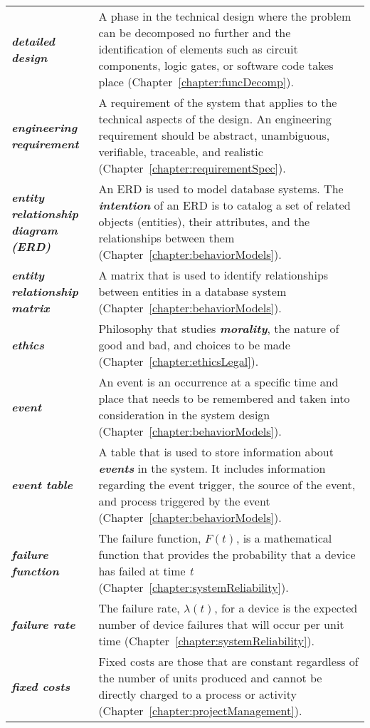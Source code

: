 \begin{longtable} { p{3cm} p{11cm}}
\emph{\textbf{detailed design}} & A phase in the technical design where
the problem can be decomposed no further and the identification of
elements such as circuit components, logic gates, or software code takes
place (Chapter~\ref{chapter:funcDecomp}). \B \\
\emph{\textbf{engineering requirement}} & A requirement of the system
that applies to the technical aspects of the design. An engineering
requirement should be abstract, unambiguous, verifiable, traceable, and
realistic (Chapter~\ref{chapter:requirementSpec}). \B \\
\emph{\textbf{entity relationship diagram (ERD)}} & An ERD is used to
model database systems. The \emph{\textbf{intention}} of an ERD is to
catalog a set of related objects (entities), their attributes, and the
relationships between them (Chapter~\ref{chapter:behaviorModels}). \B \\
\emph{\textbf{entity relationship matrix}} & A matrix that is used to
identify relationships between entities in a database system 
(Chapter~\ref{chapter:behaviorModels}). \B \\
\emph{\textbf{ethics}} & Philosophy that studies
\emph{\textbf{morality}}, the nature of good and bad, and choices to be
made (Chapter~\ref{chapter:ethicsLegal}). \B \\
\emph{\textbf{event}} & An event is an occurrence at a specific time and
place that needs to be remembered and taken into consideration in the
system design (Chapter~\ref{chapter:behaviorModels}). \B \\
\emph{\textbf{event table}} & A table that is used to store information
about \emph{\textbf{events}} in the system. It includes information
regarding the event trigger, the source of the event, and process
triggered by the event (Chapter~\ref{chapter:behaviorModels}). \B \\
\emph{\textbf{failure function}} & The failure function, $F(t)$, is
a mathematical function that provides the probability that a device has
failed at time \emph{t} (Chapter~\ref{chapter:systemReliability}). \B \\
\emph{\textbf{failure rate}} & The failure rate, $\lambda(t)$, for a
device is the expected number of device failures that will occur per
unit time (Chapter~\ref{chapter:systemReliability}). \B \\
\emph{\textbf{fixed costs}} & Fixed costs are those that are constant
regardless of the number of units produced and cannot be directly
charged to a process or activity (Chapter~\ref{chapter:projectManagement}). \B \\

\end{longtable}
